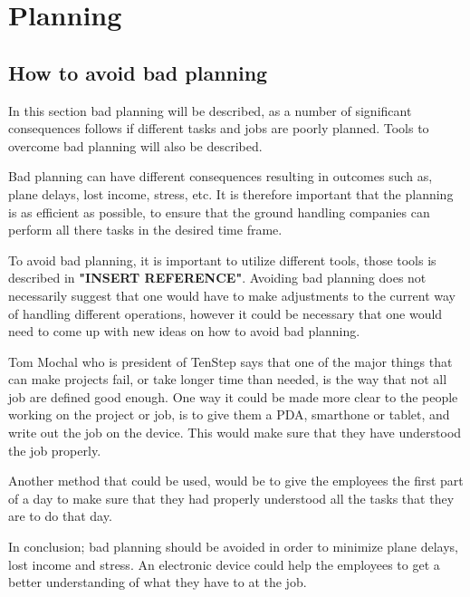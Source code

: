 \chapter{Planning}
\section{How to avoid bad planning}
In this section bad planning will be described, as a number of significant consequences follows if different tasks and jobs are poorly planned. Tools to overcome bad planning will also be described.

Bad planning can have different consequences resulting in outcomes such as, plane delays, lost income, stress, etc\cite{BadPlan_CEN12LA007}. It is therefore important that the planning is as efficient as possible, to ensure that the ground handling companies can perform all there tasks in the desired time frame.

To avoid bad planning, it is important to utilize different tools, those  tools is described in \textbf{"INSERT REFERENCE"}. Avoiding bad planning does not necessarily suggest that one would have to make adjustments to the current way of handling different operations, however it could be necessary that one would need to come up with new ideas on how to avoid bad planning.


Tom Mochal who is president of TenStep\cite{AvoidP_TenStep} says that one of the major things that can make projects fail, or take longer time than needed, is the way that not all job are defined good enough. One way it could be made more clear to the people working on the project or job, is to give them a PDA, smarthone or tablet, and write out the job on the device. This would make sure that they have understood the job properly\cite{AvoidPlan_smart}.


Another method that could be used, would be to give the employees the first part of a day to make sure that they had properly understood all the tasks that they are to do that day.

In conclusion; bad planning should be avoided in order to minimize plane delays, lost income and stress. An electronic device could help the employees to get a better understanding of what they have to at the job. 